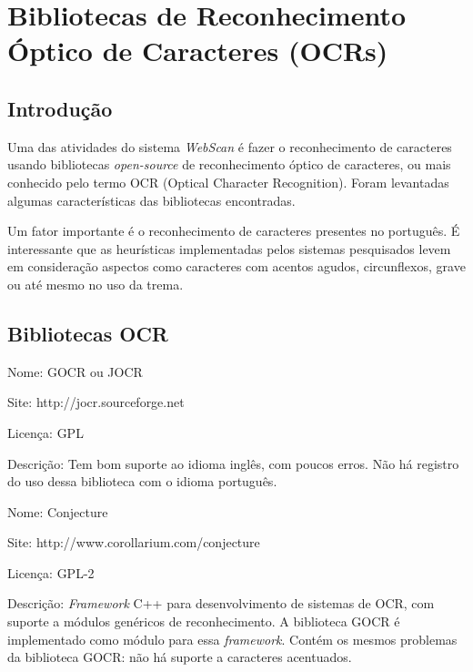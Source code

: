 \section{Bibliotecas de Reconhecimento Óptico de Caracteres (OCRs)}
\label{sec:pesquisa_ocr}

\subsection{Introdução}
Uma das atividades do sistema {\it WebScan} é fazer o reconhecimento de caracteres usando bibliotecas {\it open-source} de reconhecimento óptico de caracteres, ou mais conhecido pelo termo OCR (Optical Character Recognition). Foram levantadas algumas características das bibliotecas encontradas.

Um fator importante é o reconhecimento de caracteres presentes no português. É interessante que as heurísticas implementadas pelos sistemas pesquisados levem em consideração aspectos como caracteres com acentos agudos, circunflexos, grave ou até mesmo no uso da trema.

\subsection{Bibliotecas OCR}
\label{sec:libs_ocr}

\begin{description*}
    \item[Nome:] GOCR ou JOCR
    \item[Site:] http://jocr.sourceforge.net
    \item[Licença:] GPL
    \item[Descrição:] Tem bom suporte ao idioma inglês, com poucos erros. Não há registro do uso dessa biblioteca com o idioma português.
\end{description*}

\begin{description*}
    \item[Nome:] Conjecture
    \item[Site:] http://www.corollarium.com/conjecture
    \item[Licença:] GPL-2
    \item[Descrição:] {\it Framework} C++ para desenvolvimento de sistemas de OCR, com suporte a módulos genéricos de reconhecimento. A biblioteca GOCR é implementado como módulo para essa {\it framework}. Contém os mesmos problemas da biblioteca GOCR: não há suporte a caracteres acentuados.
\end{description*}

